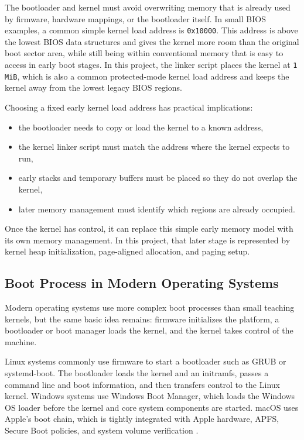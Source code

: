 The bootloader and kernel must avoid overwriting memory that is already used by firmware, hardware mappings, or the bootloader itself. In small BIOS examples, a common simple kernel load address is \texttt{0x10000}. This address is above the lowest BIOS data structures and gives the kernel more room than the original boot sector area, while still being within conventional memory that is easy to access in early boot stages. In this project, the linker script places the kernel at \texttt{1 MiB}, which is also a common protected-mode kernel load address and keeps the kernel away from the lowest legacy BIOS regions.

Choosing a fixed early kernel load address has practical implications:
\begin{itemize}
  \item the bootloader needs to copy or load the kernel to a known address,
  \item the kernel linker script must match the address where the kernel expects to run,
  \item early stacks and temporary buffers must be placed so they do not overlap the kernel,
  \item later memory management must identify which regions are already occupied.
\end{itemize}

Once the kernel has control, it can replace this simple early memory model with its own memory management. In this project, that later stage is represented by kernel heap initialization, page-aligned allocation, and paging setup.

\subsection{Boot Process in Modern Operating Systems}
Modern operating systems use more complex boot processes than small teaching kernels, but the same basic idea remains: firmware initializes the platform, a bootloader or boot manager loads the kernel, and the kernel takes control of the machine.

Linux systems commonly use firmware to start a bootloader such as GRUB or systemd-boot. The bootloader loads the kernel and an initramfs, passes a command line and boot information, and then transfers control to the Linux kernel. Windows systems use Windows Boot Manager, which loads the Windows OS loader before the kernel and core system components are started. macOS uses Apple's boot chain, which is tightly integrated with Apple hardware, APFS, Secure Boot policies, and system volume verification \cite{linuxX86BootProtocol,microsoftWindowsBootOptions,appleSiliconBootProcess,appleIntelBootProcess}.

